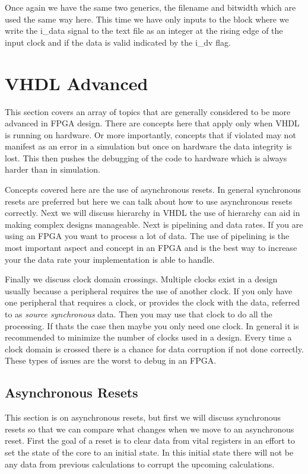 Once again we have the same two generics, the filename and bitwidth which are used the same way here. This time we have only inputs to the block where we write the i\_data signal to the text file as an integer at the rising edge of the input clock and if the data is valid indicated by the i\_dv flag. 
	
\section{VHDL Advanced}

This section covers an array of topics that are generally considered to be more advanced in \ac{FPGA} design. There are concepts here that apply only when \ac{VHDL} is running on hardware. Or more importantly, concepts that if violated may not manifest as an error in a simulation but once on hardware the data integrity is lost. This then pushes the debugging of the code to hardware which is always harder than in simulation. 

Concepts covered here are the use of asynchronous resets. In general synchronous resets are preferred but here we can talk about how to use asynchronous resets correctly. Next we will discuss hierarchy in \ac{VHDL} the use of hierarchy can aid in making complex designs manageable. Next is pipelining and data rates. If you are using an \ac{FPGA} you want to process a lot of data. The use of pipelining is the most important aspect and concept in an \ac{FPGA} and is the best way to increase your the data rate your implementation is able to handle. 

Finally we discuss clock domain crossings. Multiple clocks exist in a design usually because a peripheral requires the use of another clock. If you only have one peripheral that requires a clock, or provides the clock with the data, referred to as \emph{source synchronous} data. Then you may use that clock to do all the processing. If thats the case then maybe you only need one clock. In general it is recommended to minimize the number of clocks used in a design. Every time a clock domain is crossed there is a chance for data corruption if not done correctly. These types of issues are the worst to debug in an \ac{FPGA}. 
	
\subsection{Asynchronous Resets}
	
This section is on asynchronous resets, but first we will discuss synchronous resets so that we can compare what changes when we move to an asynchronous reset. First the goal of a reset is to clear data from vital registers in an effort to set the state of the core to an initial state. In this initial state there will not be any data from previous calculations to corrupt the upcoming calculations. 

